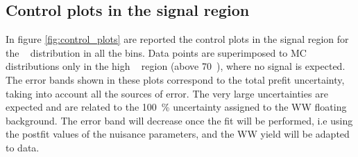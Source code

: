 \subsection{Control plots in the signal region}
In figure \ref{fig:control_plots} are reported the control plots in the signal region for the \mll~ distribution in all the \pth bins. Data points are superimposed to MC distributions only in the high \mll~ region (above 70~\GeV), where no signal is expected. The error bands shown in these plots correspond to the total prefit uncertainty, taking into account all the sources of error. The very large uncertainties are expected and are related to the 100~\% uncertainty assigned to the WW floating background. The error band will decrease once the fit will be performed, i.e using the postfit values of the nuisance parameters, and the WW yield will be adapted to data.
